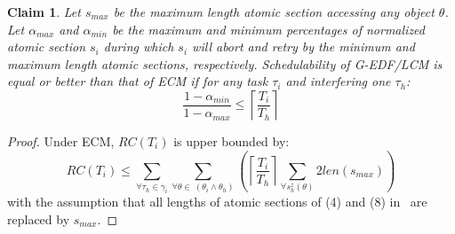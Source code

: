 \documentclass[conference]{IEEEtran}
\newtheorem{clm}{Claim}
\begin{document}
\begin{clm}\label{lcm versus ecm}
Let $s_{max}$ be the maximum length atomic section accessing any object $\theta$. Let $\alpha_{max}$ and $\alpha_{min}$ be the maximum and minimum percentages of normalized atomic section $s_i$ during which $s_i$ will abort and retry
 by the minimum and maximum length atomic sections, respectively.  Schedulability of G-EDF/LCM is equal or better than that of  ECM if for any task $\tau_i$ and interfering one $\tau_h$:
\begin{equation}
\frac{1-\alpha_{min}}{1-\alpha_{max}} \le \left\lceil\frac{T_i}{T_h}\right\rceil
\label{edf-lcm-ecm}\end{equation}
\end{clm}
\begin{proof}
Under ECM, $RC(T_{i})$ is upper bounded by:
\begin{equation}
RC(T_{i})\le\sum_{\forall \tau_{h}\in\gamma_{i}}\sum_{\forall \theta\in\ (\theta_{i}\wedge\theta_{h})}\left(\left\lceil\frac{T_{i}}{T_{h}}\right\rceil\sum_{\forall s_{h}^{z}(\theta)}2len(s_{max})\right)\label{eq61}\end{equation}
with the assumption that all lengths of atomic sections of (4) and (8) in~\cite{stmconcurrencycontrol:emsoft11} are replaced by $s_{max}$.


\end{proof}
\end{document}
